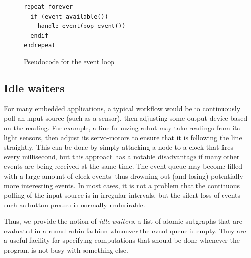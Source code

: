 \documentclass[a4paper, oneside, final]{memoir}
\begin{document}
\begin{figure}
\begin{verbatim}
repeat forever
  if (event_available())
    handle_event(pop_event())
  endif
endrepeat
\end{verbatim}
\caption{Pseudocode for the event loop}
\label{fig:eventloopcode}
\end{figure}

\subsection{Idle waiters}
\label{sec:idle waiters}
For many embedded applications, a typical workflow would be to
continuously poll an input source (such as a sensor), then adjusting
some output device based on the reading.  For example, a
line-following robot may take readings from its light sensors, then
adjust its servo-motors to ensure that it is following the line
straightly.  This can be done by simply attaching a node to a clock
that fires every millisecond, but this approach has a notable
disadvantage if many other events are being received at the same time.
The event queue may become filled with a large amount of clock events,
thus drowning out (and losing) potentially more interesting events.
In most cases, it is not a problem that the continuous polling of the
input source is in irregular intervals, but the silent loss of events
such as button presses is normally undesirable.

Thus, we provide the notion of \textit{idle waiters}, a list of atomic
subgraphs that are evaluated in a round-robin fashion whenever the
event queue is empty.  They are a useful facility for specifying
computations that should be done whenever the program is not busy with
something else.
\end{document}
